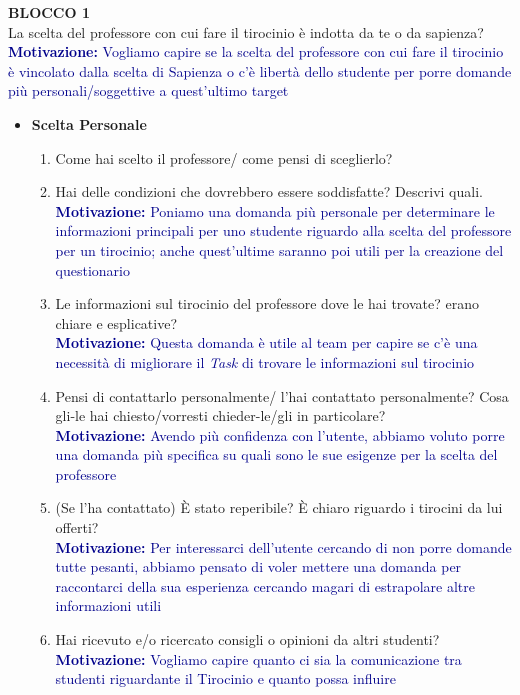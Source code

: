 \textbf{BLOCCO 1}\\
La scelta del professore con cui fare il tirocinio è indotta da te o da sapienza?\\
\textcolor{darkblue}{\textbf{Motivazione:} Vogliamo capire se la scelta del professore con cui fare il tirocinio è vincolato dalla scelta di Sapienza o c'è libertà dello studente
per porre domande più personali/soggettive a quest'ultimo target}
\begin{itemize}
    \item \textbf{Scelta Personale}
    \begin{enumerate}
        \item Come hai scelto il professore/ come pensi di sceglierlo?
        \item Hai delle condizioni che dovrebbero essere soddisfatte? Descrivi quali.\\
        \textcolor{darkblue}{\textbf{Motivazione:} Poniamo una domanda più personale per determinare le informazioni principali per
        uno studente riguardo alla scelta del professore per un tirocinio; anche quest’ultime saranno poi utili per la creazione del questionario}
        \item Le informazioni sul tirocinio del professore dove le hai trovate? erano chiare e esplicative?\\
        \textcolor{darkblue}{\textbf{Motivazione:} Questa domanda è utile al team per capire se c'è una necessità di migliorare il \textit{Task} di trovare le informazioni sul tirocinio}
        \item Pensi di contattarlo personalmente/ l'hai contattato personalmente? Cosa gli-le hai chiesto/vorresti chieder-le/gli in particolare?\\
        \textcolor{darkblue}{\textbf{Motivazione:} Avendo più confidenza con l'utente, abbiamo voluto porre una domanda più specifica su quali sono le sue esigenze per la scelta del professore}
        \item (Se l'ha contattato) È stato reperibile? È chiaro riguardo i tirocini da lui offerti?\\
        \textcolor{darkblue}{\textbf{Motivazione:} Per interessarci dell'utente cercando di non porre domande tutte pesanti, abbiamo pensato di voler mettere una domanda per raccontarci della sua esperienza 
        cercando magari di estrapolare altre informazioni utili}
        \item Hai ricevuto e/o ricercato consigli o opinioni da altri studenti?\\
        \textcolor{darkblue}{\textbf{Motivazione:} Vogliamo capire quanto ci sia la comunicazione tra studenti riguardante il Tirocinio e quanto possa influire}

\end{enumerate}
\end{itemize}
